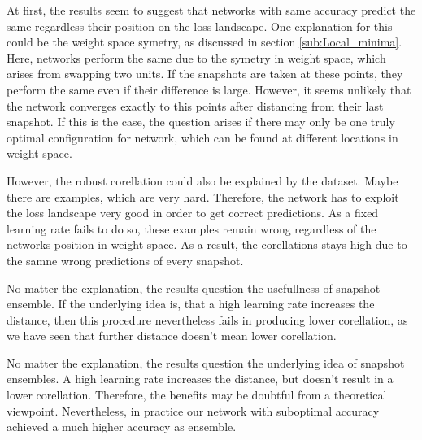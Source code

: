 At first, the results seem to suggest that networks with same accuracy predict
the same regardless their position on the loss landscape. One explanation for
this could be the weight space symetry, as discussed in section
\ref{sub:Local_minima}. Here, networks perform the same due to the symetry in
weight space, which arises from swapping two units. If the snapshots are taken
at these points, they perform the same even if their difference is large.
However, it seems unlikely that the network converges exactly to this points
after distancing from their last snapshot. If this is the case, the question
arises if there may only be one truly optimal configuration for network, which
can be found at different locations in weight space.

However, the robust corellation could also be explained by the dataset. Maybe
there are examples, which are very hard. Therefore, the network has to exploit
the loss landscape very good in order to get correct predictions. As a fixed
learning rate fails to do so, these examples remain wrong regardless of the
networks position in weight space. As a result, the corellations stays high due
to the samne wrong predictions of every snapshot.

No matter the explanation, the results question the usefullness of snapshot
ensemble. If the underlying idea is, that a high learning rate increases the
distance, then this procedure nevertheless fails in producing lower
corellation, as we have seen that further distance doesn't mean lower corellation. 


No matter the explanation, the results question the underlying idea of snapshot
ensembles. A high learning rate increases the distance, but doesn't result in a
lower corellation. Therefore, the benefits may be doubtful from a theoretical
viewpoint. Nevertheless, in practice our network with suboptimal accuracy
achieved a much higher accuracy as ensemble. 



































